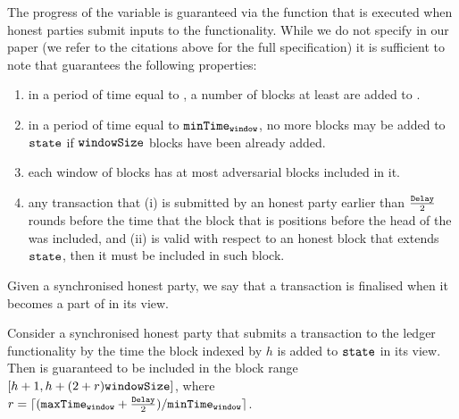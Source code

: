   The progress of the \state variable is guaranteed via the \LFextend function
  that is executed when honest parties submit inputs to the functionality. While
  we do not specify \LFextend in our paper (we refer to the citations above for
  the full specification) it is sufficient to note that \LFextend guarantees the
  following properties:
  \begin{enumerate}
    \item in a period of time equal to \maxTime, a number of blocks at least
    \windowSize are
    added to \state.
    \item in a period of time equal to $\texttt{minTime}_\texttt{window}$, no more blocks may be added to $\texttt{state}$ if $\texttt{windowSize}$ blocks have been already added. 
    \item each window of \windowSize blocks has at most \advBlocksinWindowSize\/
    adversarial blocks included in it.
    \item any transaction that (i) is submitted by an honest party earlier than
    $\frac{\texttt{Delay}}{2}$ rounds before the time that the block that is
    \windowSize positions before the head of the \state was included, 
    and (ii) is valid with respect to an honest block that extends $\texttt{state}$,
    then it must be included in such block. 
  \end{enumerate}

  Given a synchronised honest party, we say that a transaction \tx is
  finalised when it becomes a part of \state in its view.

  \begin{proposition}
    \label{prop:tochain}
    Consider a synchronised honest party that submits a transaction \tx to the
    ledger functionality by the time the block indexed by $h$ is added to
    $\texttt{state}$ in its view. Then \tx is guaranteed to be included in the block
    range $[h+1, h + (2 + r) \texttt{windowSize}]$, where $r = \lceil (\texttt{maxTime}_\texttt{window} +
    \frac{\texttt{Delay}}{2})/ \texttt{minTime}_\texttt{window} \rceil$.
  \end{proposition}

